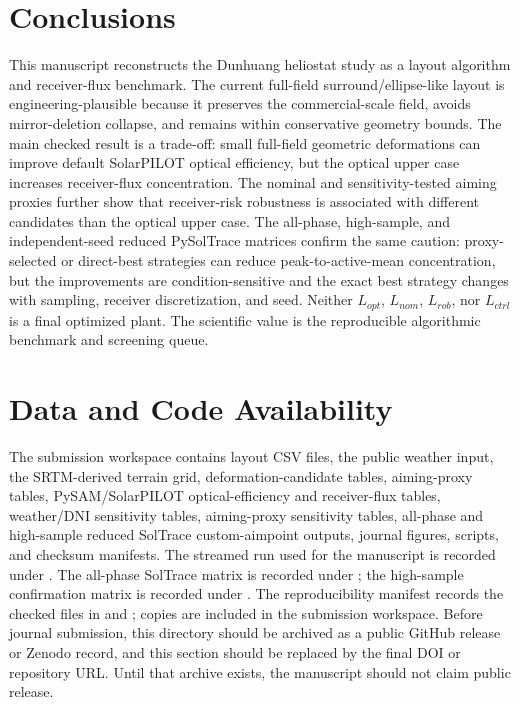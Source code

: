 \documentclass[final,3p,times]{elsarticle}
\begin{document}
\section{Conclusions}
This manuscript reconstructs the Dunhuang heliostat study as a layout algorithm and receiver-flux benchmark. The current full-field surround/ellipse-like layout is engineering-plausible because it preserves the commercial-scale field, avoids mirror-deletion collapse, and remains within conservative geometry bounds. The main checked result is a trade-off: small full-field geometric deformations can improve default SolarPILOT optical efficiency, but the optical upper case increases receiver-flux concentration. The nominal and sensitivity-tested aiming proxies further show that receiver-risk robustness is associated with different candidates than the optical upper case. The all-phase, high-sample, and independent-seed reduced PySolTrace matrices confirm the same caution: proxy-selected or direct-best strategies can reduce peak-to-active-mean concentration, but the improvements are condition-sensitive and the exact best strategy changes with sampling, receiver discretization, and seed. Neither $L_{opt}$, $L_{nom}$, $L_{rob}$, nor $L_{ctrl}$ is a final optimized plant. The scientific value is the reproducible algorithmic benchmark and screening queue.

\section{Data and Code Availability}
The submission workspace contains layout CSV files, the public weather input, the SRTM-derived terrain grid, deformation-candidate tables, aiming-proxy tables, PySAM/SolarPILOT optical-efficiency and receiver-flux tables, weather/DNI sensitivity tables, aiming-proxy sensitivity tables, all-phase and high-sample reduced SolTrace custom-aimpoint outputs, journal figures, scripts, and checksum manifests. The streamed run used for the manuscript is recorded under . The all-phase SolTrace matrix is recorded under ; the high-sample confirmation matrix is recorded under . The reproducibility manifest records the checked files in  and ; copies are included in the submission workspace. Before journal submission, this directory should be archived as a public GitHub release or Zenodo record, and this section should be replaced by the final DOI or repository URL. Until that archive exists, the manuscript should not claim public release.
\end{document}
